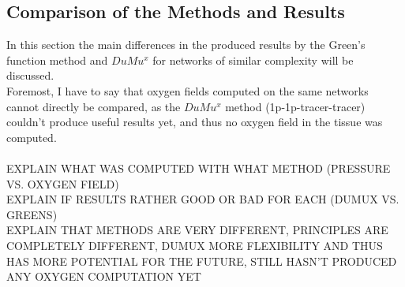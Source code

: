 \subsection{Comparison of the Methods and Results}
In this section the main differences in the produced results by the Green's function method and $DuMu^x$ for networks of similar complexity will be discussed.
\\Foremost, I have to say that oxygen fields computed on the same networks cannot directly be compared, as the $DuMu^x$ method (1p-1p-tracer-tracer) couldn't produce useful results yet, and thus no oxygen field in the tissue was computed.
\\
\\EXPLAIN WHAT WAS COMPUTED WITH WHAT METHOD (PRESSURE VS. OXYGEN FIELD)
\\EXPLAIN IF RESULTS RATHER GOOD OR BAD FOR EACH (DUMUX VS. GREENS)
\\EXPLAIN THAT METHODS ARE VERY DIFFERENT, PRINCIPLES ARE COMPLETELY DIFFERENT, DUMUX MORE FLEXIBILITY AND THUS HAS MORE POTENTIAL FOR THE FUTURE, STILL HASN'T PRODUCED ANY OXYGEN COMPUTATION YET
\\
\\


